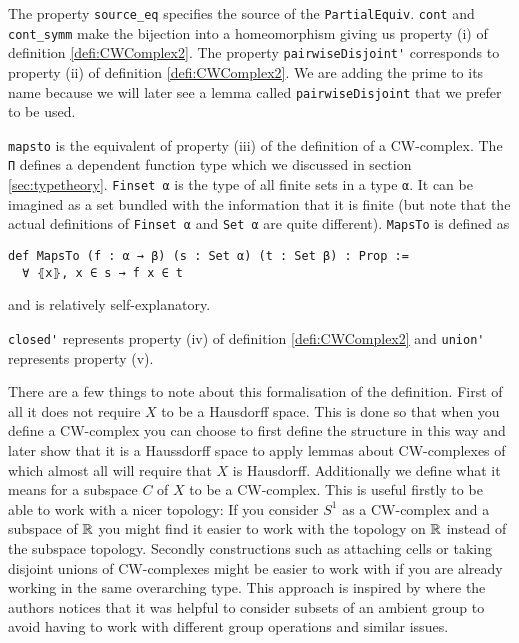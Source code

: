 The property \lstinline{source_eq} specifies the source of the \lstinline{PartialEquiv}. 
\lstinline{cont} and \lstinline{cont_symm} make the bijection into a homeomorphism giving us property (i) of definition \ref{defi:CWComplex2}.
The property \lstinline{pairwiseDisjoint'} corresponds to property (ii) of definition \ref{defi:CWComplex2}. 
We are adding the prime to its name because we will later see a lemma called \lstinline{pairwiseDisjoint} that we prefer to be used. 

\lstinline{mapsto} is the equivalent of property (iii) of the definition of a CW-complex. 
The \lstinline{Π} defines a dependent function type which we discussed in section \ref{sec:typetheory}.
\lstinline{Finset α} is the type of all finite sets in a type \lstinline{α}. 
It can be imagined as a set bundled with the information that it is finite (but note that the actual definitions of \lstinline{Finset α} and \lstinline{Set α} are quite different).
\lstinline{MapsTo} is defined as
\begin{lstlisting}
def MapsTo (f : α → β) (s : Set α) (t : Set β) : Prop := 
  ∀ ⦃x⦄, x ∈ s → f x ∈ t
\end{lstlisting}

and is relatively self-explanatory. 

\lstinline{closed'} represents property (iv) of definition \ref{defi:CWComplex2} and \lstinline{union'} represents property (v). 

\medskip

There are a few things to note about this formalisation of the definition. 
First of all it does not require $X$ to be a Hausdorff space. 
This is done so that when you define a CW-complex you can choose to first define the structure in this way and later show that it is a Haussdorff space to apply lemmas about CW-complexes of which almost all will require that $X$ is Hausdorff. 
Additionally we define what it means for a subspace $C$ of $X$ to be a CW-complex.
This is useful firstly to be able to work with a nicer topology: 
If you consider $S^1$ as a CW-complex and a subspace of $\mathbb{R}$ you might find it easier to work with the topology on $\mathbb{R}$ instead of the subspace topology. 
Secondly constructions such as attaching cells or taking disjoint unions of CW-complexes might be easier to work with if you are already working in the same overarching type.
This approach is inspired by \cite{Gonthier2013} where the authors notices that it was helpful to consider subsets of an ambient group to avoid having to work with different group operations and similar issues. 

